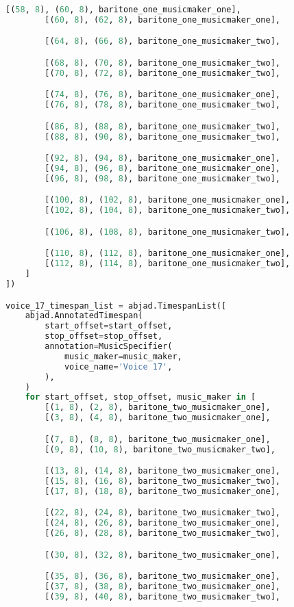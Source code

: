 \begin{lstlisting}[language=Python, caption=Invocation Source Code]
        [(58, 8), (60, 8), baritone_one_musicmaker_one],
        [(60, 8), (62, 8), baritone_one_musicmaker_one],

        [(64, 8), (66, 8), baritone_one_musicmaker_two],

        [(68, 8), (70, 8), baritone_one_musicmaker_two],
        [(70, 8), (72, 8), baritone_one_musicmaker_two],

        [(74, 8), (76, 8), baritone_one_musicmaker_one],
        [(76, 8), (78, 8), baritone_one_musicmaker_two],

        [(86, 8), (88, 8), baritone_one_musicmaker_two],
        [(88, 8), (90, 8), baritone_one_musicmaker_two],

        [(92, 8), (94, 8), baritone_one_musicmaker_one],
        [(94, 8), (96, 8), baritone_one_musicmaker_one],
        [(96, 8), (98, 8), baritone_one_musicmaker_two],

        [(100, 8), (102, 8), baritone_one_musicmaker_one],
        [(102, 8), (104, 8), baritone_one_musicmaker_two],

        [(106, 8), (108, 8), baritone_one_musicmaker_two],

        [(110, 8), (112, 8), baritone_one_musicmaker_one],
        [(112, 8), (114, 8), baritone_one_musicmaker_two],
    ]
])

voice_17_timespan_list = abjad.TimespanList([
    abjad.AnnotatedTimespan(
        start_offset=start_offset,
        stop_offset=stop_offset,
        annotation=MusicSpecifier(
            music_maker=music_maker,
            voice_name='Voice 17',
        ),
    )
    for start_offset, stop_offset, music_maker in [
        [(1, 8), (2, 8), baritone_two_musicmaker_one],
        [(3, 8), (4, 8), baritone_two_musicmaker_one],

        [(7, 8), (8, 8), baritone_two_musicmaker_one],
        [(9, 8), (10, 8), baritone_two_musicmaker_two],

        [(13, 8), (14, 8), baritone_two_musicmaker_one],
        [(15, 8), (16, 8), baritone_two_musicmaker_two],
        [(17, 8), (18, 8), baritone_two_musicmaker_one],

        [(22, 8), (24, 8), baritone_two_musicmaker_two],
        [(24, 8), (26, 8), baritone_two_musicmaker_one],
        [(26, 8), (28, 8), baritone_two_musicmaker_two],

        [(30, 8), (32, 8), baritone_two_musicmaker_one],

        [(35, 8), (36, 8), baritone_two_musicmaker_one],
        [(37, 8), (38, 8), baritone_two_musicmaker_one],
        [(39, 8), (40, 8), baritone_two_musicmaker_two],


\end{lstlisting}
